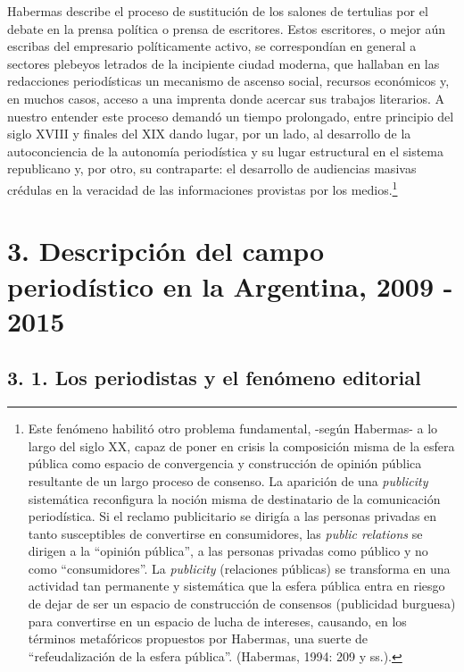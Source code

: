 Habermas describe el proceso de sustitución de los salones de tertulias por el debate en la prensa política o prensa de escritores. Estos escritores, o mejor aún escribas del empresario políticamente activo, se correspondían en general a sectores plebeyos letrados de la incipiente ciudad moderna, que hallaban en las redacciones periodísticas un mecanismo de ascenso social, recursos económicos y, en muchos casos, acceso a una imprenta donde acercar sus trabajos literarios. A nuestro entender este proceso demandó un tiempo prolongado, entre principio del siglo XVIII y finales del XIX dando lugar, por un lado, al desarrollo de la autoconciencia de la autonomía periodística y su lugar estructural en el sistema republicano y, por otro, su contraparte: el desarrollo de audiencias masivas crédulas en la veracidad de las informaciones provistas por los medios.\footnote{Este fenómeno habilitó otro problema fundamental, -según Habermas- a lo largo del siglo XX, capaz de poner en crisis la composición misma de la esfera pública como espacio de convergencia y construcción de opinión pública resultante de un largo proceso de consenso. La aparición de una \emph{publicity} sistemática reconfigura la noción misma de destinatario de la comunicación periodística. Si el reclamo publicitario se dirigía a las personas privadas en tanto susceptibles de convertirse en consumidores, las \emph{public relations} se dirigen a la \enquote{opinión pública}, a las personas privadas como público y no como \enquote{consumidores}. La \emph{publicity} (relaciones públicas) se transforma en una actividad tan permanente y sistemática que la esfera pública entra en riesgo de dejar de ser un espacio de construcción de consensos (publicidad burguesa) para convertirse en un espacio de lucha de intereses, causando, en los términos metafóricos propuestos por Habermas, una suerte de \enquote{refeudalización de la esfera pública}. (Habermas, 1994: 209 y ss.).}

\chapter{3. Descripción del campo periodístico en la Argentina, 2009 - 2015}

\section{3. 1. Los periodistas y el fenómeno editorial}

